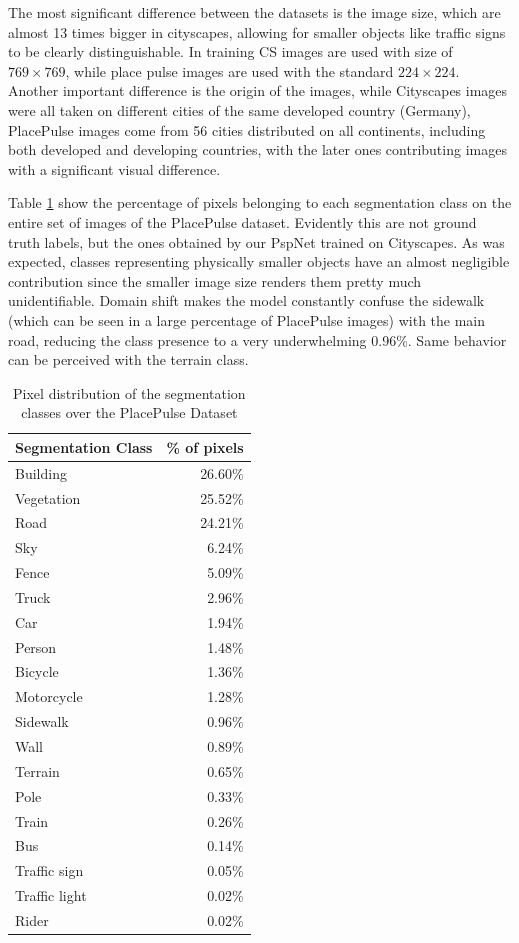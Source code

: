 The most significant difference between the datasets is the image size, which are almost 13
times bigger in cityscapes, allowing for smaller objects like traffic signs to be clearly
distinguishable. In training CS images are used with size of $769 \times 769$, while
place pulse images are used with the standard $224\times224$. Another important difference
is the origin of the images, while Cityscapes images were all taken on different cities of
the same developed country (Germany), PlacePulse images come from 56 cities distributed on all
continents, including both developed and developing countries, with the later ones contributing
images with a significant visual difference.

Table \ref{tab:segmentation} show the percentage of pixels belonging to each segmentation class
on the entire set of images of the PlacePulse dataset. Evidently this are not ground truth labels,
but the ones obtained by our  PspNet trained on Cityscapes. As was expected, classes representing
physically smaller objects have an almost negligible contribution since the smaller image size renders
them pretty much unidentifiable. Domain shift makes the model constantly confuse the sidewalk (which can
be seen in a large percentage of PlacePulse images) with the main road, reducing the class presence
to a very underwhelming 0.96\%. Same behavior can be perceived with the terrain class.


\begin{table}[H]
	\begin{tabular}{|l|r|} \hline
	Segmentation Class & \% of pixels \\ \hline
	Building      & 26.60\% \\
	Vegetation    & 25.52\% \\
	Road          & 24.21\% \\
	Sky           & 6.24\%  \\
	Fence         & 5.09\%  \\
	Truck         & 2.96\%  \\
	Car           & 1.94\%  \\
	Person        & 1.48\%  \\
	Bicycle       & 1.36\%  \\
	Motorcycle    & 1.28\%  \\
	Sidewalk      & 0.96\%  \\
	Wall          & 0.89\%  \\
	Terrain       & 0.65\%  \\
	Pole          & 0.33\%  \\
	Train         & 0.26\%  \\
	Bus           & 0.14\%  \\
	Traffic sign  & 0.05\%  \\
	Traffic light & 0.02\%  \\
	Rider         & 0.02\%  \\ \hline
	\end{tabular}
	\caption[Segmentation Distribution]{
		Pixel distribution of the segmentation classes over the PlacePulse Dataset
	}
	\label{tab:segmentation}
\end{table}